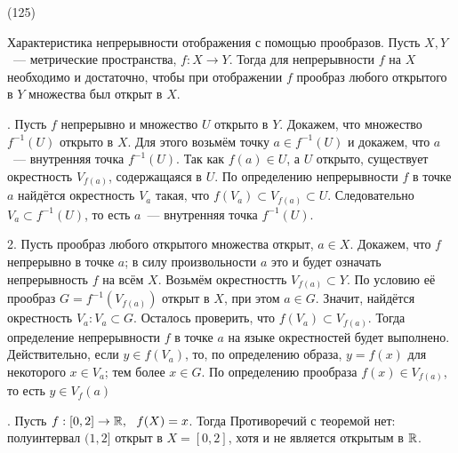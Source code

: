 (125)

\T \q Характеристика непрерывности отображения с помощью прообразов. Пусть $X, Y$~--- метрические пространства, $f: X \to Y$. Тогда для непрерывности $f$ на $X$ необходимо и достаточно, чтобы при отображении $f$ прообраз любого открытого в $Y$ множества был открыт в $X$.

. Пусть $f$ непрерывно и множество $U$ открыто в $Y$. Докажем, что множество $f^{-1} (U)$ открыто в $X$. Для этого возьмём точку $a \in f^{-1}(U)$ и докажем, что $a$~--- внутренняя точка $f^{-1} (U)$. Так как $f(a)\in U$, а $U$ открыто, существует окрестность $V_{f(a)}$, содержащаяся в $U$. По определению непрерывности $f$ в точке $a$ найдётся окрестность $V_a$ такая, что $f(V_a) \subset V_{f(a)} \subset U$. Следовательно $V_a \subset f^{-1}(U)$, то есть $a$~--- внутренняя точка $f^{-1}(U)$.

2. Пусть прообраз любого открытого множества открыт, $a \in X$. Докажем, что $f$ непрерывно в точке $a$; в силу произвольности $a$ это и будет означать непрерывность $f$ на всём $X$. Возьмём окрестностть $V_{f(a)}\subset Y$. По условию её прообраз $G = f^{-1}(V_{f(a)})$ открыт в $X$, при этом $a \in G$. Значит, найдётся окрестность $V_a: V_a \subset G$. Осталось проверить, что $f(V_a) \subset V_{f(a)}$. Тогда определение непрерывности $f$ в точке $a$ на языке окрестностей будет выполнено. Действительно, если $y \in f(V_a)$, то, по определению образа, $y = f(x)$ для некоторого $x \in V_a$; тем более $x \in G$. По определению прообраза $f(x) \in V_{f(a)}$, то есть $y \in V_f(a)$

. Пусть $f:[0, 2] \to \mathbb{R},\ \  f(X) = x$. Тогда \F{$f^{-1}(1, +\infty) = (1, 2]$.} Противоречий с теоремой нет: полуинтервал $(1, 2]$ открыт в $X = [0, 2]$, хотя и не является открытым в $\mathbb{R}$.